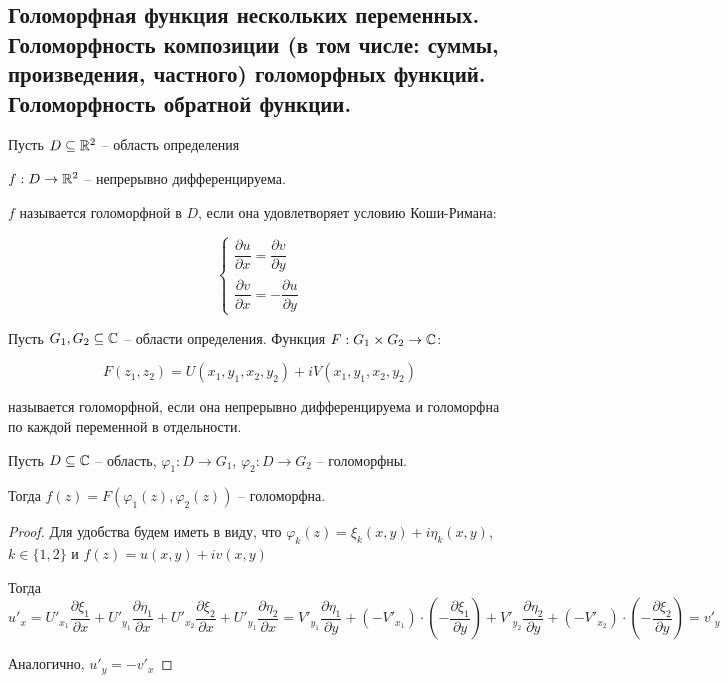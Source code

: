 \subsection{Голоморфная функция нескольких переменных. Голоморфность композиции (в том числе: суммы, произведения, частного) голоморфных функций. Голоморфность обратной функции.}

\begin{definition*}
    Пусть $D \subseteq \mathbb{R}^2$ -- область определения

    $f: D \to \mathbb{R}^2$ -- непрерывно дифференцируема.

    $f$ называется голоморфной в $D$, если она удовлетворяет условию Коши-Римана:
    
    \begin{equation}
        \begin{cases}
            \dfrac{\partial u}{\partial x} = \dfrac{\partial v}{\partial y} \\
            \dfrac{\partial v}{\partial x} = -\dfrac{\partial u}{\partial y}
        \end{cases}
    \end{equation}

\end{definition*}

\begin{definition*}
    Пусть $G_1, G_2 \subseteq \mathbb{C}$ -- области определения. Функция $F: G_1 \times G_2 \to \mathbb{C}$:

    \begin{equation}
            F(z_1, z_2) = U(x_1, y_1, x_2, y_2) + i V(x_1, y_1, x_2, y_2)
    \end{equation}
    
    называется голоморфной, если она непрерывно дифференцируема и голоморфна по каждой переменной в отдельности.
\end{definition*}

\begin{theorem*}
    Пусть $D \subseteq \mathbb{C}$ -- область, $\varphi_1: D \to G_1$, $\varphi_2: D \to G_2$ -- голоморфны. 

    Тогда $f(z) = F\left( \varphi_1(z), \varphi_2(z) \right)$ -- голоморфна.
\end{theorem*}

\begin{proof}
    Для удобства будем иметь в виду, что $\varphi_k(z) = \xi_k(x, y) + i \eta_k(x, y)$, $k \in \{1, 2\}$ и $f(z) = u(x, y) + iv(x, y)$
    
    Тогда
    \[
        u'_x = U'_{x_1}\dfrac{\partial \xi_1}{\partial x} + U'_{y_1}\dfrac{\partial \eta_1}{\partial x} + U'_{x_2}\dfrac{\partial \xi_2}{\partial x} + U'_{y_1}\dfrac{\partial \eta_2}{\partial x} = V'_{y_1}\dfrac{\partial \eta_1}{\partial y} + \left(-V'_{x_1}\right) \cdot \left( - \dfrac{\partial \xi_1}{\partial y} \right) + V'_{y_2} \dfrac{\partial \eta_2}{\partial y} + \left( -V'_{x_2} \right) \cdot \left( - \dfrac{\partial \xi_2}{\partial y} \right) = v'_y
    \]
        
    Аналогично, $u'_y = -v'_x$
\end{proof}

